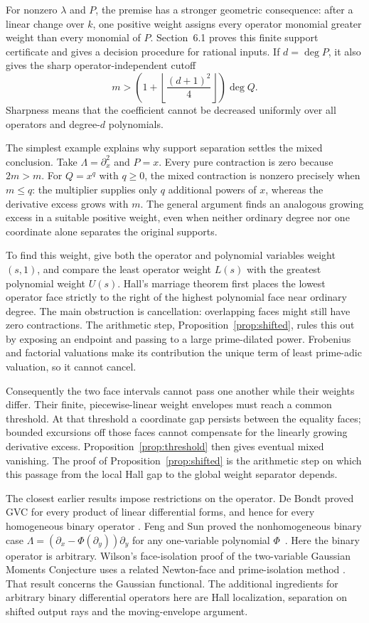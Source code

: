 \documentclass[11pt]{article}
\begin{document}
For nonzero $\lambda$ and $P$, the premise has a stronger geometric
consequence: after a linear change
over $k$, one positive weight assigns every operator monomial greater
weight than every monomial of $P$.
Section~6.1 proves this finite support certificate and gives a decision
procedure for rational inputs.  If $d=\deg P$, it also gives the sharp
operator-independent cutoff
\[
 m>\left(1+\left\lfloor\frac{(d+1)^2}{4}\right\rfloor\right)\deg Q.
\]
Sharpness means that the coefficient cannot be decreased uniformly over
all operators and degree-$d$ polynomials.

The simplest example explains why support separation settles the mixed
conclusion.  Take $\Lambda=\partial_x^2$ and $P=x$.
Every pure contraction is zero because $2m>m$.  For $Q=x^q$ with
$q\geq0$,
the mixed contraction is nonzero precisely when $m\leq q$: the
multiplier supplies only $q$ additional powers of $x$, whereas the
derivative excess grows with $m$.
The general argument finds an analogous growing excess in a suitable
positive weight, even when neither ordinary degree nor one coordinate
alone separates the original supports.

To find this weight, give both the operator and polynomial variables
weight $(s,1)$, and compare the least operator weight $L(s)$ with the
greatest polynomial weight $U(s)$.  Hall's marriage theorem first places
the lowest operator face strictly to the right of the highest polynomial
face near ordinary degree.  The main obstruction is cancellation:
overlapping faces might still have zero contractions.  The arithmetic
step, Proposition~\ref{prop:shifted}, rules this out by exposing an
endpoint and passing to a large prime-dilated power.  Frobenius and
factorial valuations make its contribution the unique term of least
prime-adic valuation, so it cannot cancel.

Consequently the two face intervals cannot pass one another while their
weights differ.  Their finite, piecewise-linear weight envelopes must
reach a common threshold.  At that threshold a coordinate gap persists
between the equality faces; bounded excursions off those faces cannot
compensate for the linearly growing derivative excess.
Proposition~\ref{prop:threshold} then gives eventual mixed vanishing.
The proof of Proposition~\ref{prop:shifted} is the arithmetic step on
which this passage from the local Hall gap to the global weight
separator depends.

The closest earlier results impose restrictions on the operator.
De Bondt proved GVC for every product of linear differential forms,
and hence for every homogeneous binary operator
\cite[Theorem~4 and Corollary~5]{deBondt}.
Feng and Sun proved the nonhomogeneous binary case
$\Lambda=(\partial_x-\Phi(\partial_y))\partial_y$
for any one-variable polynomial $\Phi$~\cite{FengSun}.
Here the binary operator is arbitrary.
Wilson's face-isolation proof of the two-variable Gaussian Moments
Conjecture uses a related Newton-face and prime-isolation method
\cite[Theorem~1 and Lemma~7]{WilsonGMC}.
That result concerns the Gaussian functional.  The additional ingredients
for arbitrary binary differential operators here are Hall localization,
separation on shifted output rays and the moving-envelope argument.
\end{document}

